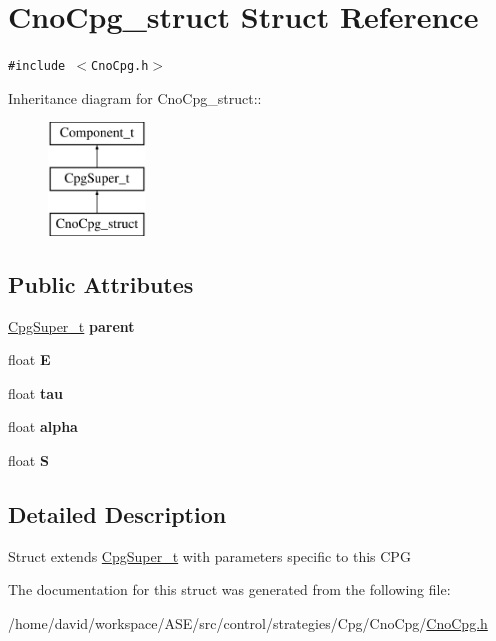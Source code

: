 \hypertarget{structCnoCpg__struct}{
\section{CnoCpg\_\-struct Struct Reference}
\label{structCnoCpg__struct}
}
{\tt \#include $<$CnoCpg.h$>$}

Inheritance diagram for CnoCpg\_\-struct::\begin{figure}[H]
\begin{center}
\leavevmode
\includegraphics[height=3cm]{structCnoCpg__struct}
\end{center}
\end{figure}
\subsection*{Public Attributes}
\begin{CompactItemize}
\item 
\hypertarget{structCnoCpg__struct_2d5154add183af9301d2edb68cb8be4a}{
\hyperlink{structCpgSuper__t}{CpgSuper\_\-t} \textbf{parent}}
\label{structCnoCpg__struct_2d5154add183af9301d2edb68cb8be4a}

\item 
\hypertarget{structCnoCpg__struct_380033ff38971c6e3e51729ad12fa8c9}{
float \textbf{E}}
\label{structCnoCpg__struct_380033ff38971c6e3e51729ad12fa8c9}

\item 
\hypertarget{structCnoCpg__struct_11071bdbab9ce0c791380ef0fde59cc9}{
float \textbf{tau}}
\label{structCnoCpg__struct_11071bdbab9ce0c791380ef0fde59cc9}

\item 
\hypertarget{structCnoCpg__struct_c9aa1521103bb1d65f19d6b52cb44bc1}{
float \textbf{alpha}}
\label{structCnoCpg__struct_c9aa1521103bb1d65f19d6b52cb44bc1}

\item 
\hypertarget{structCnoCpg__struct_5b17e6be103969866c57fe86cfed66e1}{
float \textbf{S}}
\label{structCnoCpg__struct_5b17e6be103969866c57fe86cfed66e1}

\end{CompactItemize}


\subsection{Detailed Description}
Struct extends \hyperlink{structCpgSuper__t}{CpgSuper\_\-t} with parameters specific to this CPG 

The documentation for this struct was generated from the following file:\begin{CompactItemize}
\item 
/home/david/workspace/ASE/src/control/strategies/Cpg/CnoCpg/\hyperlink{CnoCpg_8h}{CnoCpg.h}\end{CompactItemize}
